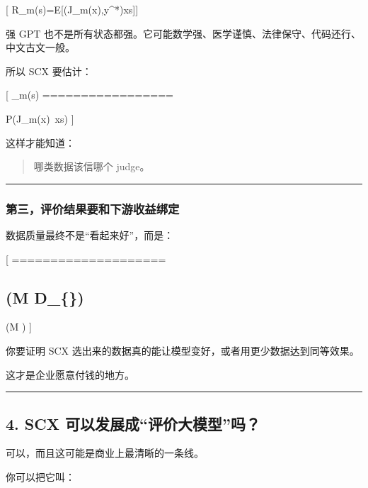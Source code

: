 \documentclass[
  12pt,
]{ctexart}
\begin{document}
{[} R\_m(s)=\mathbb E{[}\ell(J\_m(x),y\^{}*)\mid x\in s{]}{]}

强 GPT
也不是所有状态都强。它可能数学强、医学谨慎、法律保守、代码还行、中文古文一般。

所以 SCX 要估计：

{[} \_m(s) =================

P(J\_m(x)~\mid x\in s) {]}

这样才能知道：

\begin{quote}
哪类数据该信哪个 judge。
\end{quote}

\begin{center}\rule{0.5\linewidth}{0.5pt}\end{center}

\subsubsection{第三，评价结果要和下游收益绑定}\label{ux7b2cux4e09ux8bc4ux4ef7ux7ed3ux679cux8981ux548cux4e0bux6e38ux6536ux76caux7ed1ux5b9a}

数据质量最终不是``看起来好''，而是：

{[} \Delta {} ====================

\subsection{\texorpdfstring{(\mathcal M 
\mathcal D\_\{\})}{(M  D\_\{\})}}\label{m-d_}

(\mathcal M ) {]}

你要证明 SCX 选出来的数据真的能让模型变好，或者用更少数据达到同等效果。

这才是企业愿意付钱的地方。

\begin{center}\rule{0.5\linewidth}{0.5pt}\end{center}

\subsection{4. SCX
可以发展成``评价大模型''吗？}\label{scx-ux53efux4ee5ux53d1ux5c55ux6210ux8bc4ux4ef7ux5927ux6a21ux578bux5417}

可以，而且这可能是商业上最清晰的一条线。

你可以把它叫：
\end{document}
